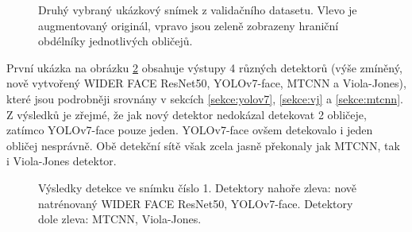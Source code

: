 \begin{figure}[H] 
  \begin{center}
  \label{obrazek:test2gt}
  \caption{Druhý vybraný ukázkový snímek z validačního datasetu. Vlevo je augmentovaný originál, vpravo jsou zeleně zobrazeny hraniční obdélníky jednotlivých obličejů.}
  \end{center}
\end{figure}

První ukázka na obrázku \ref{obrazek:test1} obsahuje výstupy 4 různých detektorů (výše zmíněný, nově vytvořený WIDER FACE ResNet50, YOLOv7-face, MTCNN a Viola-Jones), které jsou podrobněji srovnány v sekcích \ref{sekce:yolov7}, \ref{sekce:vj} a \ref{sekce:mtcnn}. Z výsledků je zřejmé, že jak nový detektor nedokázal detekovat 2 obličeje, zatímco YOLOv7-face pouze jeden. YOLOv7-face ovšem detekovalo i jeden obličej nesprávně. Obě detekční sítě však zcela jasně překonaly jak MTCNN, tak i Viola-Jones detektor.

\begin{figure}[H] 
  \begin{center}
  \label{obrazek:test1}
  \caption{Výsledky detekce ve snímku číslo 1. Detektory nahoře zleva: nově natrénovaný WIDER FACE ResNet50, YOLOv7-face. Detektory dole zleva: MTCNN, Viola-Jones.}
  \end{center}
\end{figure}

